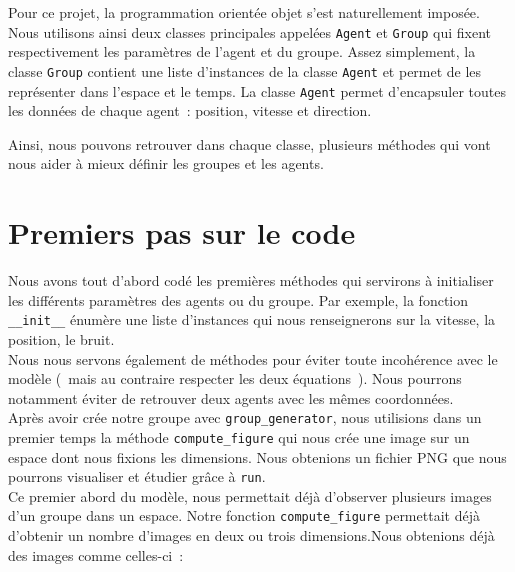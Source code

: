 \documentclass[french, a4paper, 12pt, openany]{report}
\begin{document}
    Pour ce projet, la programmation orientée objet s'est naturellement imposée. Nous utilisons ainsi deux classes principales appelées \verb|Agent| et \verb|Group| qui fixent respectivement les paramètres de l'agent et du groupe. Assez simplement, la classe \verb|Group| contient une liste d'instances de la classe \verb|Agent| et permet de les représenter dans l'espace et le temps. La classe \verb|Agent| permet d'encapsuler toutes les données de chaque agent~: position, vitesse et direction.
    
   Ainsi, nous pouvons retrouver dans chaque classe, plusieurs méthodes qui vont nous aider à mieux définir les groupes et les agents. \\
   
\section{Premiers pas sur le code}
   
   Nous avons tout d'abord codé les premières méthodes qui servirons à initialiser les différents paramètres des agents ou du groupe. Par exemple, la fonction \verb|__init__|  énumère une liste d'instances qui nous renseignerons sur la vitesse, la position, le bruit.\\
   Nous nous servons également de méthodes pour éviter toute incohérence avec le modèle (~mais au contraire respecter les deux équations~). Nous pourrons notamment éviter de retrouver deux agents avec les mêmes coordonnées.\\
   
   Après avoir crée notre groupe avec \verb|group_generator|, nous utilisions dans un premier temps la méthode  \verb|compute_figure| qui nous crée une image sur un espace dont nous fixions les dimensions. Nous obtenions un fichier PNG que nous pourrons visualiser et étudier grâce à \verb|run|.\\
	
	Ce premier abord du modèle, nous permettait déjà d'observer plusieurs images d'un groupe dans un espace. Notre fonction \verb|compute_figure| permettait déjà d'obtenir un nombre d'images en deux ou trois dimensions.Nous obtenions déjà des images comme celles-ci~:\\
	
\end{document}
